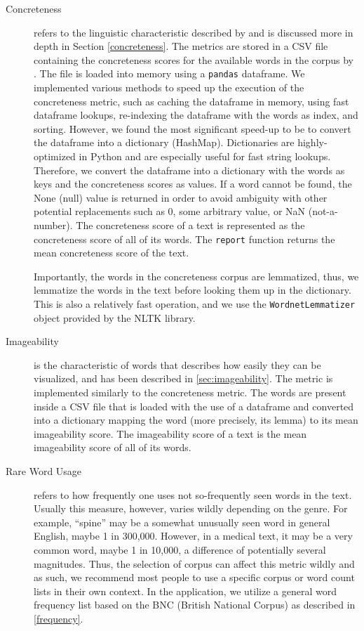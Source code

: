 \begin{description}
    \item[Concreteness] refers to the linguistic characteristic described by \cite{brysbaert2014concreteness} and is discussed more in depth in Section \ref{concreteness}. The metrics are stored in a CSV file containing the concreteness scores for the available words in the corpus by \cite{brysbaert2014concreteness}. The file is loaded into memory using a \texttt{pandas} dataframe. We implemented various methods to speed up the execution of the concreteness metric, such as caching the dataframe in memory, using fast dataframe lookups, re-indexing the dataframe with the words as index, and sorting. However, we found the most significant speed-up to be to convert the dataframe into a dictionary (HashMap). Dictionaries are highly-optimized in Python and are especially useful for fast string lookups. Therefore, we convert the dataframe into a dictionary with the words as keys and the concreteness scores as values. If a word cannot be found, the None (null) value is returned in order to avoid ambiguity with other potential replacements such as 0, some arbitrary value, or NaN (not-a-number). The concreteness score of a text is represented as the concreteness score of all of its words. The \texttt{report} function returns the mean concreteness score of the text. 
    
    Importantly, the words in the concreteness corpus are lemmatized, thus, we lemmatize the words in the text before looking them up in the dictionary. This is also a relatively fast operation, and we use the \texttt{WordnetLemmatizer} object provided by the NLTK library.
    \item[Imageability] is the characteristic of words that describes how easily they can be visualized, and has been described in \ref{sec:imageability}. The metric is implemented similarly to the concreteness metric. The words are present inside a CSV file that is loaded with the use of a dataframe and converted into a dictionary mapping the word (more precisely, its lemma) to its mean imageability score. The imageability score of a text is the mean imageability score of all of its words.
    \item[Rare Word Usage] refers to how frequently one uses not so-frequently seen words in the text. Usually this measure, however, varies wildly depending on the genre. For example, ``spine'' may be a somewhat unusually seen word in general English, maybe 1 in 300,000. However, in a medical text, it may be a very common word, maybe 1 in 10,000, a difference of potentially several magnitudes. Thus, the selection of corpus can affect this metric wildly and as such, we recommend most people to use a specific corpus or word count lists in their own context. In the application, we utilize a general word frequency list based on the BNC (British National Corpus) as described in \ref{frequency}. 
    

\end{description}
